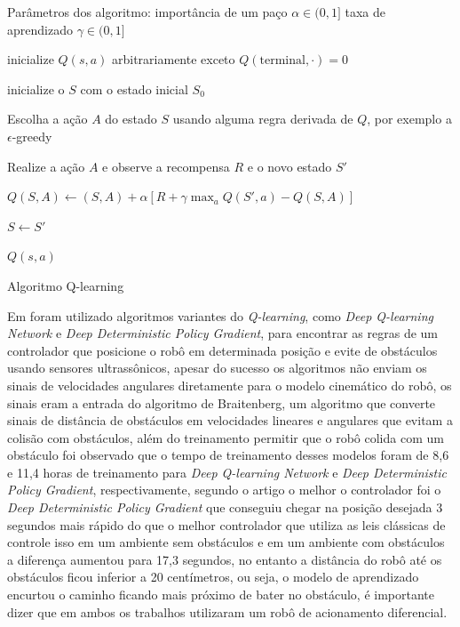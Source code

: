 \begin{algorithm}[H]
    \label{Q-learning:}
    Parâmetros dos algoritmo: importância de um paço $\alpha \in (0,1]$
    taxa de aprendizado $\gamma \in (0,1] $

    
    
    inicialize $Q(s,a)$ arbitrariamente exceto $Q(\text{terminal},\cdot ) = 0$

     {
        inicialize o $S$ com o estado inicial $S_0$

        
         {
            Escolha a ação $A$ do estado $S$ usando alguma regra derivada de $Q$,
            por exemplo a $\epsilon$-greedy

            Realize a ação $A$ e observe a recompensa $R$ e o novo estado $S'$
            
            $Q(S,A) \leftarrow (S,A) + \alpha[R + \gamma \max_aQ(S',a) - Q(S,A)]$
            
            $S \leftarrow S'$


        }
        
    }
    \Retorna $Q(s,a)$
    \caption{Algoritmo Q-learning}
    
\end{algorithm}

Em \cite{quiroga2022position}
foram utilizado algoritmos variantes do \textit{Q-learning}, como \textit{Deep Q-learning Network} e \textit{Deep Deterministic Policy Gradient},
para encontrar as regras de um controlador que posicione o robô em determinada
posição e evite de obstáculos usando sensores ultrassônicos, apesar do sucesso
os algoritmos não enviam os sinais de velocidades angulares
diretamente para o modelo cinemático do robô, os sinais
eram a entrada do algoritmo de Braitenberg, um algoritmo que converte
sinais de distância de obstáculos em velocidades lineares e angulares
que evitam a colisão com obstáculos, além do treinamento permitir que o robô
colida com um obstáculo foi observado que o tempo de treinamento desses modelos
foram de 8,6 e 11,4 horas de treinamento para \textit{Deep Q-learning Network}
e \textit{Deep Deterministic Policy Gradient}, respectivamente, segundo o
artigo o melhor o controlador foi o \textit{Deep Deterministic Policy Gradient}
que conseguiu chegar na posição desejada 3 segundos mais rápido do que o
melhor controlador que utiliza as leis clássicas de controle isso em um ambiente sem
obstáculos e em um ambiente com obstáculos a diferença aumentou para
17,3 segundos, no entanto a distância do robô até os obstáculos ficou
inferior a 20 centímetros, ou seja, o modelo de aprendizado encurtou o
caminho ficando mais próximo de bater no obstáculo, é importante dizer que
em ambos os trabalhos utilizaram um robô de acionamento diferencial.

